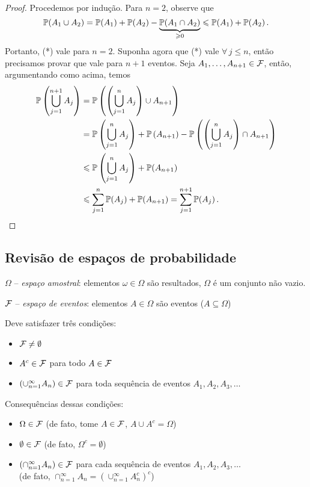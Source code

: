 \begin{proof}
Procedemos por indução. Para $n=2$, observe que 
\begin{equation}
\mathbb{P}(A_1 \cup A_2) = \mathbb{P}(A_1) + \mathbb{P}(A_2) - \underbrace{\mathbb{P}(A_1 \cap A_2)}_{\geqslant 0} \leqslant \mathbb{P}(A_1) + \mathbb{P}(A_2) \,.
\end{equation}
Portanto, (*) vale para $n=2$. Suponha agora que (*) vale $\forall \, j \leq n$, então precisamos provar que vale para $n+1$ eventos. Seja $A_1, \dots, A_{n+1} \in \mathcal F$, então, argumentando como acima, temos
\begin{align}
\mathbb{P}\left(\bigcup_{j=1}^{n+1} A_j\right) &= \mathbb{P}\left(\left(\bigcup_{j=1}^{n} A_j\right) \cup A_{n+1}\right) \\
&= \mathbb{P}\left(\bigcup_{j=1}^{n} A_j\right) + \mathbb{P}\left(A_{n+1}\right) - \mathbb{P}\left(\left(\bigcup_{j=1}^{n} A_j\right) \cap A_{n+1}\right)\\
&\leqslant \mathbb{P}\left(\bigcup_{j=1}^{n} A_j\right) + \mathbb{P}(A_{n+1}) \\
&\leqslant \sum_{j=1}^{n} \mathbb{P}(A_j) + \mathbb{P}(A_{n+1}) = \sum_{j=1}^{n+1} \mathbb{P}(A_j) \,.
\qedhere
\end{align}
\end{proof}

\subsection*{Revisão de espaços de probabilidade}

$ \Omega $ -- \emph{espaço amostral}: elementos $ \omega\in\Omega $ são resultados, $ \Omega $ é um conjunto não vazio.

$ \mathcal F $ -- \emph{espaço de eventos}: elementos $ A \in \Omega $ são eventos ($ A \subseteq \Omega $)

Deve satisfazer três condições:
\begin{itemize}
\item
$\mathcal F \ne \emptyset$
\item
$ A^c \in \mathcal F $ para todo $ A \in \mathcal F $
\item
$ (\cup_{n=1}^\infty A_n) \in \mathcal F $ para toda sequência de eventos $ A_1,A_2,A_3,\dots $
\end{itemize}

Consequências dessas condições:
\begin{itemize}
\item
$ \Omega \in \mathcal F $ (de fato, tome $ A \in \mathcal F $, $ A \cup A^c = \Omega $)
\item
$ \emptyset \in \mathcal F $ (de fato, $ \Omega^c = \emptyset $)
\item
$ (\cap_{n=1}^\infty A_n) \in \mathcal F $
para cada sequência de eventos $ A_1, A_2, A_3, \dots $
\\
(de fato, $ \cap_{n=1}^\infty A_n = (\cup_{n=1}^\infty A_n^c)^c $)
\end{itemize}


